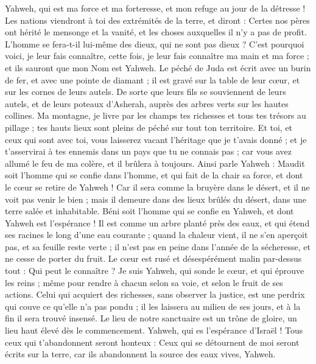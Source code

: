 \begin{multicols}{2}
Yahweh, qui est ma force et ma forteresse, et mon refuge au jour de la détresse ! Les nations viendront à toi des extrémités de la terre, et diront : Certes nos pères ont hérité le mensonge et la vanité, et les choses auxquelles il n'y a pas de profit.
L'homme se fera-t-il lui-même des dieux, qui ne sont pas dieux ?
C'est pourquoi voici, je leur fais connaître, cette fois, je leur fais connaître ma main et ma force ; et ils sauront que mon Nom est Yahweh.
\VerseOne{}Le péché de Juda est écrit avec un burin de fer, et avec une pointe de diamant ; il est gravé sur la table de leur cœur, et sur les cornes de leurs autels.
De sorte que leurs fils se souviennent de leurs autels, et de leurs poteaux d'Asherah, auprès des arbres verts sur les hautes collines.
Ma montagne, je livre par les champs tes richesses et tous tes trésors au pillage ; tes hauts lieux sont pleins de péché sur tout ton territoire.
Et toi, et ceux qui sont avec toi, vous laisserez vacant l'héritage que je t'avais donné ; et je t'asservirai à tes ennemis dans un pays que tu ne connais pas ; car vous avez allumé le feu de ma colère, et il brûlera à toujours.
Ainsi parle Yahweh : Maudit soit l'homme qui se confie dans l'homme, et qui fait de la chair sa force, et dont le cœur se retire de Yahweh !
Car il sera comme la bruyère dans le désert, et il ne voit pas venir le bien ; mais il demeure dans des lieux brûlés du désert, dans une terre salée et inhabitable.
Béni soit l'homme qui se confie en Yahweh, et dont Yahweh est l'espérance !
Il est comme un arbre planté près des eaux, et qui étend ses racines le long d'une eau courante ; quand la chaleur vient, il ne s'en aperçoit pas, et sa feuille reste verte ; il n'est pas en peine dans l'année de la sécheresse, et ne cesse de porter du fruit.
Le cœur est rusé et désespérément malin par-dessus tout : Qui peut le connaître ?
Je suis Yahweh, qui sonde le cœur, et qui éprouve les reins ; même pour rendre à chacun selon sa voie, et selon le fruit de ses actions.
Celui qui acquiert des richesses, sans observer la justice, est une perdrix qui couve ce qu'elle n'a pas pondu ; il les laissera au milieu de ses jours, et à la fin il sera trouvé insensé.
Le lieu de notre sanctuaire est un trône de gloire, un lieu haut élevé dès le commencement.
Yahweh, qui es l'espérance d'Israël ! Tous ceux qui t'abandonnent seront honteux : Ceux qui se détournent de moi seront écrits sur la terre, car ils abandonnent la source des eaux vives, Yahweh.

\end{multicols}
